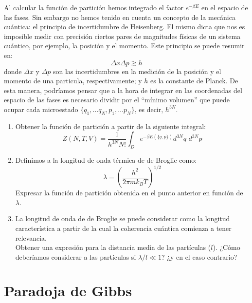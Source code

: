 \documentclass[a4paper,11pt]{article}
\begin{document}
Al calcular la función de partición hemos integrado el factor 
$e^{-\beta E}$ en el espacio de las fases. Sin embargo no hemos tenido 
en cuenta un concepto de la mecánica cuántica: el principio de 
incertidumbre de Heisenberg. El mismo dicta que nos es imposible medir 
con precisión ciertos pares de magnitudes físicas de un sistema 
cuántico, por ejemplo, la posición y el momento. Este principio se 
puede resumir en:
$$ \Delta x \Delta p \gtrsim  h$$
donde $\Delta x$ y $\Delta p$ son las incertidumbres en la medición de 
la posición y el momento de una particula, respectivamente; y $h$ es 
la constante de Planck.
De esta manera, podríamos pensar que a la hora de integrar en las 
coordenadas del espacio de las fases es necesario dividir por el 
``mínimo volumen'' que puede ocupar cada microestado 
$\{ q_1, \dots q_N, p_1, \dots p_N \}$, es decir, $h^{3N}$.

\begin{enumerate}[label=(\alph*),
                  leftmargin=2\parindent,
                  rightmargin=2\parindent]
      
    \item{\label{item:de-broglie-particion}
          Obtener la función de partición a partir de la siguiente 
          integral:
          $$
          Z(N, T, V) =
            \frac{1}{h^{3N} N!}
            \int_D e^{-\beta E(\{q, p\})} d^{3N}q \,\, d^{3N}p
          $$
          }

    \item{Definimos a la longitud de onda térmica de de Broglie como:
          $$ \lambda = \left( \frac{h^2}{2\pi m k_B T} \right)^{1/2} $$
          Expresar la función de partición obtenida en el punto 
          anterior en función de $\lambda$.
          }

    \item{La longitud de onda de de Broglie se puede considerar como la 
          longitud característica a partir de la cual la coherencia 
          cuántica comienza a tener relevancia.\\
          Obtener una expresión para la distancia media de las 
          partículas ($l$). ¿Cómo deberíamos considerar a las 
          partículas si $\lambda/l \ll 1$? ¿y en el caso contrario?
          }
          
\end{enumerate}


\section{Paradoja de Gibbs}
\end{document}
